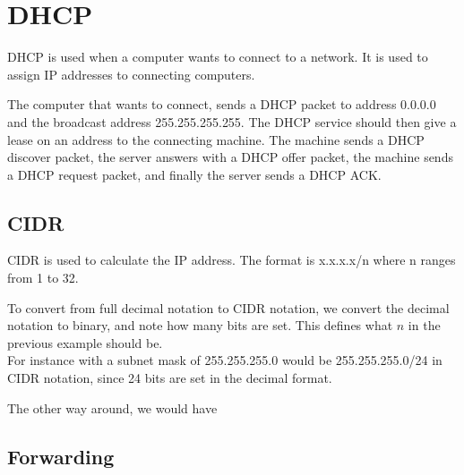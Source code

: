 \section{DHCP}
DHCP is used when a computer wants to connect to a network. It is used
to assign IP addresses to connecting computers.

The computer that wants to connect, sends a DHCP packet to address
0.0.0.0 and the broadcast address 255.255.255.255. The DHCP service
should then give a lease on an address to the connecting
machine. The machine sends a DHCP discover packet, the server answers
with a DHCP offer packet, the machine sends a DHCP request packet, and
finally the server sends a DHCP ACK.

\subsection{CIDR}
CIDR is used to calculate the IP address. The format is x.x.x.x/n
where n ranges from 1 to 32.

To convert from full decimal notation to CIDR notation, we convert the
decimal notation to binary, and note how many bits are set. This
defines what $n$ in the previous example should be.\\
For instance with a subnet mask of 255.255.255.0 would be
255.255.255.0/24 in CIDR notation, since 24 bits are set in the
decimal format.

The other way around, we would have 

\subsection{Forwarding}